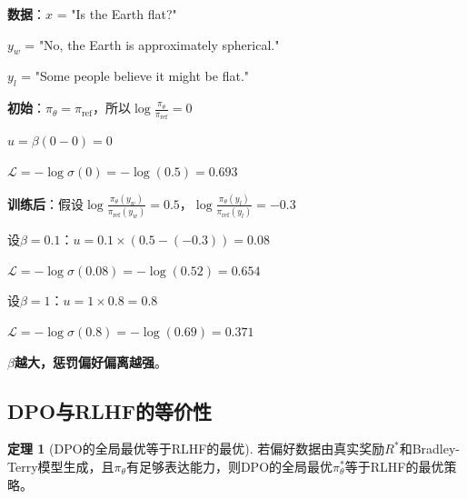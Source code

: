 \documentclass[11pt,a4paper]{article}
\theoremstyle{definition}
\newtheorem{theorem}{定理}[section]
\begin{document}
\begin{calculation}[DPO的数值例子]
\textbf{数据}：$x$ = "Is the Earth flat?"

$y_w$ = "No, the Earth is approximately spherical."

$y_l$ = "Some people believe it might be flat."

\textbf{初始}：$\pi_\theta = \pi_{\text{ref}}$，所以$\log \frac{\pi_\theta}{\pi_{\text{ref}}} = 0$

$u = \beta (0 - 0) = 0$

$\mathcal{L} = -\log \sigma(0) = -\log(0.5) = 0.693$

\textbf{训练后}：假设$\log \frac{\pi_\theta(y_w)}{\pi_{\text{ref}}(y_w)} = 0.5$，$\log \frac{\pi_\theta(y_l)}{\pi_{\text{ref}}(y_l)} = -0.3$

设$\beta = 0.1$：$u = 0.1 \times (0.5 - (-0.3)) = 0.08$

$\mathcal{L} = -\log \sigma(0.08) = -\log(0.52) = 0.654$

设$\beta = 1$：$u = 1 \times 0.8 = 0.8$

$\mathcal{L} = -\log \sigma(0.8) = -\log(0.69) = 0.371$

\textbf{$\beta$越大，惩罚偏好偏离越强}。
\end{calculation}

\subsection{DPO与RLHF的等价性}

\begin{theorem}[DPO的全局最优等于RLHF的最优]
若偏好数据由真实奖励$R^*$和Bradley-Terry模型生成，且$\pi_\theta$有足够表达能力，则DPO的全局最优$\pi_\theta^*$等于RLHF的最优策略。
\end{theorem}
\end{document}
